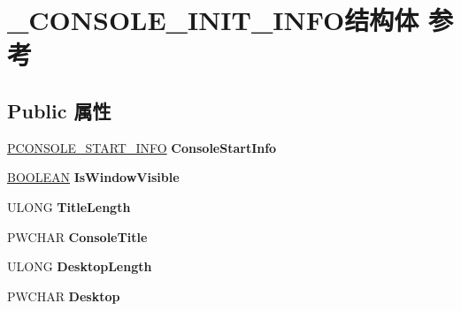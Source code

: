\hypertarget{struct___c_o_n_s_o_l_e___i_n_i_t___i_n_f_o}{}\section{\+\_\+\+C\+O\+N\+S\+O\+L\+E\+\_\+\+I\+N\+I\+T\+\_\+\+I\+N\+F\+O结构体 参考}
\label{struct___c_o_n_s_o_l_e___i_n_i_t___i_n_f_o}
\subsection*{Public 属性}
\begin{DoxyCompactItemize}
\item 
\mbox{\label{struct___c_o_n_s_o_l_e___i_n_i_t___i_n_f_o_a718bfcda88babc6e186cdec45793eb29}} 
\hyperlink{struct___c_o_n_s_o_l_e___s_t_a_r_t___i_n_f_o}{P\+C\+O\+N\+S\+O\+L\+E\+\_\+\+S\+T\+A\+R\+T\+\_\+\+I\+N\+FO} {\bfseries Console\+Start\+Info}
\item 
\mbox{\label{struct___c_o_n_s_o_l_e___i_n_i_t___i_n_f_o_a75bdbdecf9cdee1878665825cdb86b6a}} 
\hyperlink{_processor_bind_8h_a112e3146cb38b6ee95e64d85842e380a}{B\+O\+O\+L\+E\+AN} {\bfseries Is\+Window\+Visible}
\item 
\mbox{\label{struct___c_o_n_s_o_l_e___i_n_i_t___i_n_f_o_a58e63ec96b7be726cd959b832e0515a1}} 
U\+L\+O\+NG {\bfseries Title\+Length}
\item 
\mbox{\label{struct___c_o_n_s_o_l_e___i_n_i_t___i_n_f_o_a8c546e74e1bb7c38c5157bb6bd287bda}} 
P\+W\+C\+H\+AR {\bfseries Console\+Title}
\item 
\mbox{\label{struct___c_o_n_s_o_l_e___i_n_i_t___i_n_f_o_a4e246e7c22a5bcc29f3afeebaba97541}} 
U\+L\+O\+NG {\bfseries Desktop\+Length}
\item 
\mbox{\label{struct___c_o_n_s_o_l_e___i_n_i_t___i_n_f_o_a93b6d1eaf371ef25ae93b0657287ea93}} 
P\+W\+C\+H\+AR {\bfseries Desktop}
\item 
\mbox{\label{struct___c_o_n_s_o_l_e___i_n_i_t___i_n_f_o_a8f675de9c8553f01972007ed0c46f9f5}} 

\end{DoxyCompactItemize}
